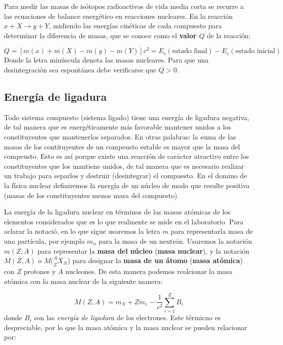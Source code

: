 Para medir las masas de isótopos radioactivos de vida media corta se recurre a las ecuaciones de balance energético en reacciones nucleares. En la reacción $x+X\rightarrow y+Y$, midiendo las energías cinéticas de cada compuesto para determinar la diferencia de masas, que se conoce como el \textbf{valor $Q$} de la reacción:

\begin{equation}
	Q=[m(x)+m(X)-m(y)-m(Y)]c^2 = E_c (\text{estado final}) -  E_c (\text{estado inicial})
\end{equation}
Donde la letra minúscula denota las masas nucleares. Para que una desintegración sea espontánea debe verificarse que $Q>0$.

\subsection{Energía de ligadura}

Todo sistema compuesto (sistema ligado) tiene una energía de ligadura negativa, de tal manera que es energéticamente más favorable mantener unidos a los constituyentes que mantenerlos separados. En otras palabras: la suma de las masas de los contituyentes de un compeusto estable es mayor que la masa del compeusto. Esto es así porque existe una reacción de carácter atractivo entre los constituyentes que los mantiene unidos, de tal manera que es necesario realizar un trabajo para separlos y destruir (desintegrar) el compuesto. En el domino de la física nuclear definiremos la energía de un núcleo de modo que resulte positiva (masas de los constituyentes menos masa del compuesto).

La energía de la ligadura nuclear en términos de las masas atómicas de los elementos considerados que es lo que realmente se mide en el laboratorio. Para aclarar la notació, en lo que sigue usaremos la letra $m$ para representarla masa de una partícula, por ejemplo $m_n$ para la masa de un neutrón. Usaremos la notación $m(Z,A)$ para representar la \textbf{masa del núcleo} (\textbf{masa nuclear}), y la notación $M(Z,A)$ o $M(_Z^A X_N$) para designar la \textbf{masa de un átomo} (\textbf{masa atómica}) con $Z$ protones y $A$ nucleones. De esta manera podemos realcionar la masa atómica con la masa nuclear de la siguiente manera:

\begin{equation}
	M(Z,A) = m_N + Zm_e - \frac{1}{c^2} \sum_{i=1}^Z B_i
\end{equation}
donde $B_i$ son las \textit{energía de ligadura} de los electrones. Este térmicno es despreciable, por lo que la masa atómica y la masa nuclear se pueden relacionar por:

